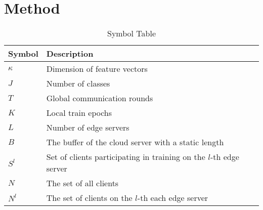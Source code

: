 \documentclass[journal]{IEEEtran}
\begin{document}
\section{Method}
\begin{table}[H]
  \caption{Symbol Table}
  \centering
  \renewcommand{\arraystretch}{1.2}
  \begin{tabular}{|@{}m{1cm}<{\centering}|m{6.5cm}|}
    \hline
    \textbf{Symbol}                       & \textbf{Description}                                                                                                                  \\
    \hline
    \( \kappa \)                               & Dimension of feature vectors                                                                                                                     \\
    \hline
    \( J \)                               & Number of classes                                                                                                                     \\
    \hline
    \( T \)                               & Global communication rounds                                                                                                                         \\
    \hline
     \( K \)                               & Local train epochs                                                                                                                          \\
    \hline
     \( L \)                               & Number of edge servers                                                                                                                \\
    \hline
     \( B \)                               & The buffer of the cloud server with a static length                                                                                   \\
    \hline
    \( S^{l} \)                           & Set of clients participating in training on the \( l \)-th edge server                                                                \\
    \hline
     \( N \)                             & The set of all clients                                                                                  \\
    \hline
     \( N^l \)                             & The set of clients on the $l$-th each edge server                                                                                      \\

\end{tabular}
\end{table}
\end{document}
